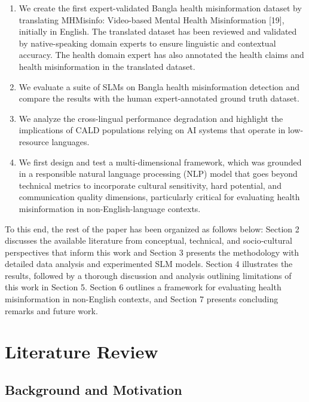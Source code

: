 \documentclass[]{article}
\begin{document}
\begin{enumerate}
\def\labelenumi{\arabic{enumi}.}
\item
  We create the first expert-validated Bangla health misinformation
  dataset by translating MHMisinfo: Video-based Mental Health
  Misinformation {[}19{]}, initially in English. The translated dataset
  has been reviewed and validated by native-speaking domain experts to
  ensure linguistic and contextual accuracy. The health domain expert
  has also annotated the health claims and health misinformation in the
  translated dataset.
\item
  We evaluate a suite of SLMs on Bangla health misinformation detection
  and compare the results with the human expert-annotated ground truth
  dataset.
\item
  We analyze the cross-lingual performance degradation and highlight the
  implications of CALD populations relying on AI systems that operate in low-resource languages.
  \item
  We first design and test a multi-dimensional framework, which was grounded in a responsible natural language processing (NLP) model that goes beyond technical metrics to incorporate cultural sensitivity, hard potential, and communication quality dimensions, particularly critical for evaluating health misinformation in non-English-language contexts.

  
\end{enumerate}
To this end, the rest of the paper has been organized as follows below: Section 2 discusses the available literature from conceptual, technical, and socio‑cultural perspectives that inform this work and Section 3 presents the methodology with detailed data analysis and experimented SLM models. Section 4 illustrates the results, followed by a thorough discussion and analysis outlining limitations of this work in Section 5. Section 6 outlines a framework for evaluating health misinformation in non-English contexts, and Section 7 presents concluding remarks and future work.
\section{Literature Review}

\subsection{Background and Motivation}
\end{document}
